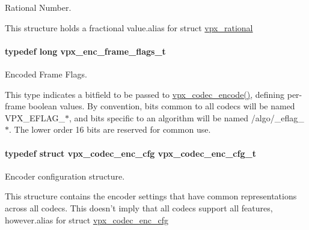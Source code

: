 Rational Number. 

This structure holds a fractional value.\+alias for struct \hyperlink{structvpx__rational}{vpx\+\_\+rational} \hypertarget{group__encoder_ga99e4a3c966f0de19fe1aa626bd860366}{
\paragraph[{vpx\+\_\+enc\+\_\+frame\+\_\+flags\+\_\+t}]{\setlength{\rightskip}{0pt plus 5cm}typedef long {\bf vpx\+\_\+enc\+\_\+frame\+\_\+flags\+\_\+t}}}\label{group__encoder_ga99e4a3c966f0de19fe1aa626bd860366}


Encoded Frame Flags. 

This type indicates a bitfield to be passed to \hyperlink{group__encoder_gaf990542e2aeb389f05fae3e9c7803639}{vpx\+\_\+codec\+\_\+encode()}, defining per-\/frame boolean values. By convention, bits common to all codecs will be named V\+P\+X\+\_\+\+E\+F\+L\+A\+G\+\_\+$\ast$, and bits specific to an algorithm will be named /algo/\+\_\+eflag\+\_\+$\ast$. The lower order 16 bits are reserved for common use. \hypertarget{group__encoder_ga946236c809e493b31a815d82db1e59db}{
\paragraph[{vpx\+\_\+codec\+\_\+enc\+\_\+cfg\+\_\+t}]{\setlength{\rightskip}{0pt plus 5cm}typedef struct {\bf vpx\+\_\+codec\+\_\+enc\+\_\+cfg}  {\bf vpx\+\_\+codec\+\_\+enc\+\_\+cfg\+\_\+t}}}\label{group__encoder_ga946236c809e493b31a815d82db1e59db}


Encoder configuration structure. 

This structure contains the encoder settings that have common representations across all codecs. This doesn't imply that all codecs support all features, however.\+alias for struct \hyperlink{structvpx__codec__enc__cfg}{vpx\+\_\+codec\+\_\+enc\+\_\+cfg} 


